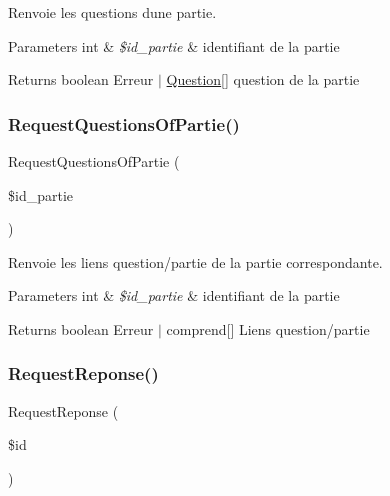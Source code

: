 Renvoie les questions d\textquotesingle{}une partie. 


\begin{DoxyParams}[1]{Parameters}
int & {\em \$id\+\_\+partie} & identifiant de la partie\\
\hline
\end{DoxyParams}
\begin{DoxyReturn}{Returns}
boolean Erreur $\vert$ \mbox{\hyperlink{class_question}{Question}}\mbox{[}\mbox{]} question de la partie 
\end{DoxyReturn}
\mbox{\label{class_interface_b_d_d_aed61db0c78fb2022c40b11e4c7623096}} 
\subsubsection{\texorpdfstring{Request\+Questions\+Of\+Partie()}{RequestQuestionsOfPartie()}}
{\footnotesize\ttfamily Request\+Questions\+Of\+Partie (\begin{DoxyParamCaption}\item[{}]{\$id\+\_\+partie }\end{DoxyParamCaption})}



Renvoie les liens question/partie de la partie correspondante. 


\begin{DoxyParams}[1]{Parameters}
int & {\em \$id\+\_\+partie} & identifiant de la partie\\
\hline
\end{DoxyParams}
\begin{DoxyReturn}{Returns}
boolean Erreur $\vert$ comprend\mbox{[}\mbox{]} Liens question/partie 
\end{DoxyReturn}
\mbox{\label{class_interface_b_d_d_a653d317c29317946ca25680b7ce39c98}} 
\subsubsection{\texorpdfstring{Request\+Reponse()}{RequestReponse()}}
{\footnotesize\ttfamily Request\+Reponse (\begin{DoxyParamCaption}\item[{}]{\$id }\end{DoxyParamCaption})}



